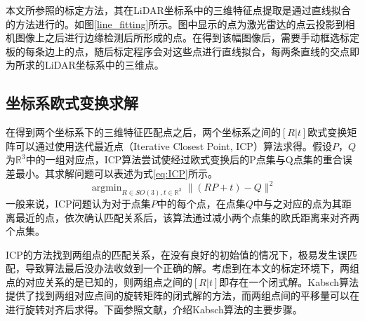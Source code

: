 本文所参照的标定方法，其在LiDAR坐标系中的三维特征点提取是通过直线拟合的方法进行的。如图\ref{line_fitting}所示。图中显示的点为激光雷达的点云投影到相机图像上之后进行边缘检测后所形成的点。在得到该幅图像后，需要手动框选标定板的每条边上的点，随后标定程序会对这些点进行直线拟合，每两条直线的交点即为所求的LiDAR坐标系中的三维点。

\subsection{坐标系欧式变换求解}

在得到两个坐标系下的三维特征匹配点之后，两个坐标系之间的$[R|t]$欧式变换矩阵可以通过使用迭代最近点（Iterative Closest Point, ICP）算法求得。假设$P$，$Q$为$\mathbb{R}^3$中的一组对应点，ICP算法尝试使经过欧式变换后的P点集与Q点集的重合误差最小。其求解问题可以表述为式\ref{eq:ICP}所示。
\begin{equation}
    \mathop{\arg\min}_{R\in SO(3), t\in \mathbb{R}^3}  \| (RP+t)-Q \|^2 
    \label{eq:ICP}
\end{equation}
一般来说，ICP问题认为对于点集$P$中的每个点，在点集$Q$中与之对应的点为其距离最近的点，依次确认匹配关系后，该算法通过减小两个点集的欧氏距离来对齐两个点集。

ICP的方法找到两组点的匹配关系，在没有良好的初始值的情况下，极易发生误匹配，导致算法最后没办法收敛到一个正确的解。考虑到在本文的标定环境下，两组点的对应关系的是已知的，则两组点之间的$[R|t]$即存在一个闭式解。Kabsch算法提供了找到两组对应点间的旋转矩阵的闭式解的方法，而两组点间的平移量可以在进行旋转对齐后求得。下面参照文献，介绍Kabsch算法的主要步骤。

